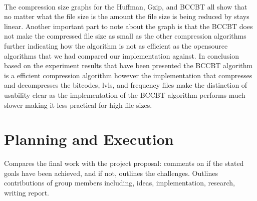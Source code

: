 \documentclass[12pt]{IEEEtran}
\begin{document}
\\
The compression size graphs for the Huffman, Gzip, and BCCBT all show that no matter
what the file size is the amount the file size is being reduced by stays linear.  Another
important part to note about the graph is that the BCCBT does not make the compressed file size
as small as the other compression algorithms further indicating how the algorithm is not as 
efficient as the opensource algorithms that we had compared our implementation against. In conclusion
based on the experiment results that have been presented the BCCBT algorithm is a efficient 
compression algorithm however the implementation that compresses and decompresses the bitcodes,
lvls, and frequency files make the distinction of usability clear as the implementation of the 
BCCBT algorithm performs much slower making it less practical for high file sizes.
\section{Planning and Execution}
Compares the final work with the project proposal: comments on if the stated goals have been achieved, and if not, outlines the challenges.
Outlines contributions of group members including, ideas, implementation, research, writing report.



\end{document}
